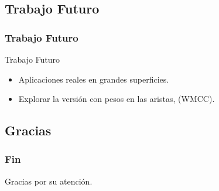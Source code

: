 \subsection{Trabajo Futuro}
\begin{frame} \frametitle{Trabajo Futuro}
\begin{block} {Trabajo Futuro}
 	 \begin{itemize}
 	 	\item Aplicaciones reales en grandes superficies.
 	 	\item Explorar la versión con pesos en las aristas, (WMCC).
 	 \end{itemize}  
 \end{block} 	   
\end{frame}

\subsection{Gracias}
\begin{frame} \frametitle{Fin}
\begin{huge}
Gracias por su atención.
\end{huge}

\end{frame}

%    
%    
